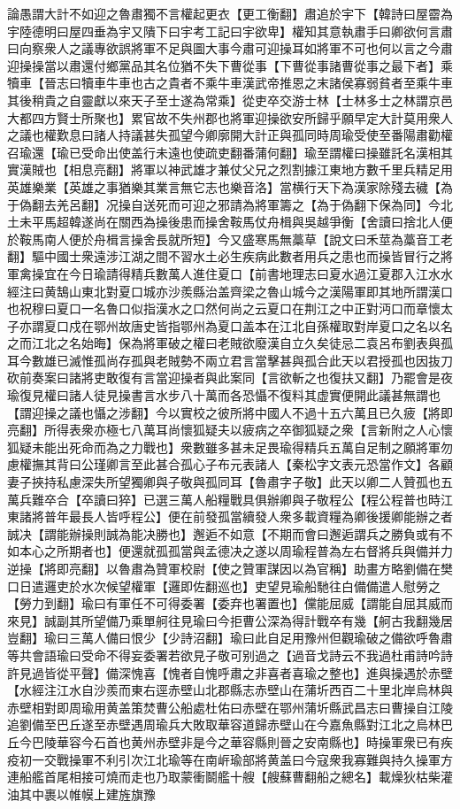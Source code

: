 論愚謂大計不如迎之魯肅獨不言權起更衣【更工衡翻】肅追於宇下【韓詩曰屋霤為宇陸德明曰屋四垂為宇又隤下曰宇考工記曰宇欲卑】權知其意執肅手曰卿欲何言肅曰向察衆人之議專欲誤將軍不足與圖大事今肅可迎操耳如將軍不可也何以言之今肅迎操操當以肅還付鄉黨品其名位猶不失下曹從事【下曹從事諸曹從事之最下者】乘犢車【晉志曰犢車牛車也古之貴者不乘牛車漢武帝推恩之末諸侯寡弱貧者至乘牛車其後稍貴之自靈獻以來天子至士遂為常乘】從吏卒交游士林【士林多士之林謂京邑大都四方賢士所聚也】累官故不失州郡也將軍迎操欲安所歸乎願早定大計莫用衆人之議也權歎息曰諸人持議甚失孤望今卿廓開大計正與孤同時周瑜受使至番陽肅勸權召瑜還【瑜已受命出使盖行未遠也使疏吏翻番蒲何翻】瑜至謂權曰操雖託名漢相其實漢賊也【相息亮翻】將軍以神武雄才兼仗父兄之烈割據江東地方數千里兵精足用英雄樂業【英雄之事猶樂其業言無它志也樂音洛】當横行天下為漢家除殘去穢【為于偽翻去羌呂翻】况操自送死而可迎之邪請為將軍籌之【為于偽翻下保為同】今北土未平馬超韓遂尚在關西為操後患而操舍鞍馬仗舟楫與吳越爭衡【舍讀曰捨北人便於鞍馬南人便於舟楫言操舍長就所短】今又盛寒馬無藁草【說文曰禾莖為藁音工老翻】驅中國士衆遠涉江湖之間不習水土必生疾病此數者用兵之患也而操皆冒行之將軍禽操宜在今日瑜請得精兵數萬人進住夏口【前書地理志曰夏水過江夏郡入江水水經注曰黄鵠山東北對夏口城亦沙羨縣治盖齊梁之魯山城今之漢陽軍即其地所謂漢口也祝穆曰夏口一名魯口似指漢水之口然何尚之云夏口在荆江之中正對沔口而章懷太子亦謂夏口戍在鄂州故唐史皆指鄂州為夏口盖本在江北自孫權取對岸夏口之名以名之而江北之名始晦】保為將軍破之權曰老賊欲廢漢自立久矣徒忌二袁呂布劉表與孤耳今數雄已滅惟孤尚存孤與老賊勢不兩立君言當擊甚與孤合此天以君授孤也因抜刀砍前奏案曰諸將吏敢復有言當迎操者與此案同【言欲斬之也復扶又翻】乃罷會是夜瑜復見權曰諸人徒見操書言水步八十萬而各恐懾不復料其虚實便開此議甚無謂也【謂迎操之議也懾之涉翻】今以實校之彼所將中國人不過十五六萬且已久疲【將即亮翻】所得表衆亦極七八萬耳尚懷狐疑夫以疲病之卒御狐疑之衆【言新附之人心懷狐疑未能出死命而為之力戰也】衆數雖多甚未足畏瑜得精兵五萬自足制之願將軍勿慮權撫其背曰公瑾卿言至此甚合孤心子布元表諸人【秦松字文表元恐當作文】各顧妻子挾持私慮深失所望獨卿與子敬與孤同耳【魯肅字子敬】此天以卿二人贊孤也五萬兵難卒合【卒讀曰猝】已選三萬人船糧戰具俱辦卿與子敬程公【程公程普也時江東諸將普年最長人皆呼程公】便在前發孤當續發人衆多載資糧為卿後援卿能辦之者誠决【謂能辦操則誠為能决勝也】邂逅不如意【不期而會曰邂逅謂兵之勝負或有不如本心之所期者也】便還就孤孤當與孟德决之遂以周瑜程普為左右督將兵與備并力逆操【將即亮翻】以魯肅為贊軍校尉【使之贊軍謀因以為官稱】助畫方略劉備在樊口日遣邏吏於水次候望權軍【邏即佐翻巡也】吏望見瑜船馳往白備備遣人慰勞之【勞力到翻】瑜曰有軍任不可得委署【委弃也署置也】儻能屈威【謂能自屈其威而來見】誠副其所望備乃乘單舸往見瑜曰今拒曹公深為得計戰卒有幾【舸古我翻幾居豈翻】瑜曰三萬人備曰恨少【少詩沼翻】瑜曰此自足用豫州但觀瑜破之備欲呼魯肅等共會語瑜曰受命不得妄委署若欲見子敬可别過之【過音戈詩云不我過杜甫詩吟詩許見過皆從平聲】備深愧喜【愧者自愧呼肅之非喜者喜瑜之整也】進與操遇於赤壁【水經注江水自沙羨而東右逕赤壁山北郡縣志赤壁山在蒲圻西百二十里北岸烏林與赤壁相對即周瑜用黄盖策焚曹公船處杜佑曰赤壁在鄂州蒲圻縣武昌志曰曹操自江陵追劉備至巴丘遂至赤壁遇周瑜兵大敗取華容道歸赤壁山在今嘉魚縣對江北之烏林巴丘今巴陵華容今石首也黄州赤壁非是今之華容縣則晉之安南縣也】時操軍衆已有疾疫初一交戰操軍不利引次江北瑜等在南㟁瑜部將黄盖曰今寇衆我寡難與持久操軍方連船艦首尾相接可燒而走也乃取蒙衝鬬艦十艘【艘蘇曹翻船之總名】載燥狄枯柴灌油其中裹以帷幙上建旌旗豫